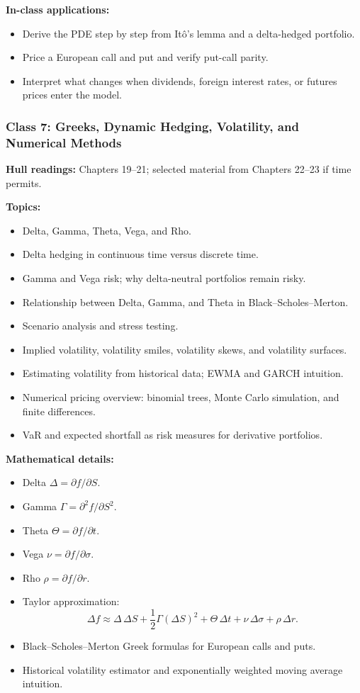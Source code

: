 \documentclass[11pt]{article}
\begin{document}
\textbf{In-class applications:}
\begin{itemize}
    \item Derive the PDE step by step from It\^o's lemma and a delta-hedged portfolio.
    \item Price a European call and put and verify put-call parity.
    \item Interpret what changes when dividends, foreign interest rates, or futures prices enter the model.
\end{itemize}

\subsubsection*{Class 7: Greeks, Dynamic Hedging, Volatility, and Numerical Methods}
\textbf{Hull readings:} Chapters 19--21; selected material from Chapters 22--23 if time permits.

\textbf{Topics:}
\begin{itemize}
    \item Delta, Gamma, Theta, Vega, and Rho.
    \item Delta hedging in continuous time versus discrete time.
    \item Gamma and Vega risk; why delta-neutral portfolios remain risky.
    \item Relationship between Delta, Gamma, and Theta in Black--Scholes--Merton.
    \item Scenario analysis and stress testing.
    \item Implied volatility, volatility smiles, volatility skews, and volatility surfaces.
    \item Estimating volatility from historical data; EWMA and GARCH intuition.
    \item Numerical pricing overview: binomial trees, Monte Carlo simulation, and finite differences.
    \item VaR and expected shortfall as risk measures for derivative portfolios.
\end{itemize}

\textbf{Mathematical details:}
\begin{itemize}
    \item Delta $\Delta=\partial f/\partial S$.
    \item Gamma $\Gamma=\partial^2 f/\partial S^2$.
    \item Theta $\Theta=\partial f/\partial t$.
    \item Vega $\nu=\partial f/\partial \sigma$.
    \item Rho $\rho=\partial f/\partial r$.
    \item Taylor approximation:
    \[
        \Delta f \approx \Delta\,\Delta S+\frac{1}{2}\Gamma(\Delta S)^2+\Theta\,\Delta t+\nu\,\Delta\sigma+\rho\,\Delta r.
    \]
    \item Black--Scholes--Merton Greek formulas for European calls and puts.
    \item Historical volatility estimator and exponentially weighted moving average intuition.
\end{itemize}
\end{document}
